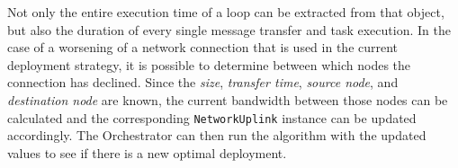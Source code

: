 Not only the entire execution time of a loop can be extracted from that object, but also the duration of every single message transfer and task execution.
In the case of a worsening of a network connection that is used in the current deployment strategy, it is possible to determine between which nodes the connection has declined.
Since the \textit{size}, \textit{transfer time}, \textit{source node}, and \textit{destination node} are known, the current bandwidth between those nodes can be calculated and the corresponding \texttt{NetworkUplink} instance can be updated accordingly.
The Orchestrator can then run the algorithm with the updated values to see if there is a new optimal deployment.